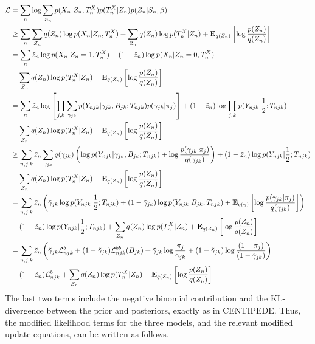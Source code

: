 \documentclass[reqno]{amsart}
\numberwithin{equation}{section}
\begin{document}
\begin{align}
    \likelihood
        &= \sum_{n} \log \sum_{Z_n} p(X_n|Z_n,T^X_n) p(T^X_n|Z_n) p(Z_n|S_n,\beta) \\
        &\geq \sum_n \sum_{Z_n} q(Z_n) \log p(X_n|Z_n,T^X_n) + \sum_{Z_n} q(Z_n) \log p(T^X_n | Z_n) + \expect{\log \frac{p(Z_n)}{q(Z_n)}}{q(Z_n)} \\
        &= \sum_n \zv_n \log p(X_n|Z_n=1,T^X_n) + (1-\zv_n) \log p(X_n|Z_n=0,T^X_n) \notag\\
        &+ \sum_{Z_n} q(Z_n) \log p(T^X_n | Z_n) + \expect{\log \frac{p(Z_n)}{q(Z_n)}}{q(Z_n)} \\
        &= \sum_n \zv_n \log \left[ \prod_{j,k} \sum_{\gamma_{jk}} p(Y_{njk} | \gamma_{jk}, B_{jk}; T_{njk}) p(\gamma_{jk} | \pi_j) \right]
        + (1-\zv_n) \log \prod_{j,k} p(Y_{njk} | \half; T_{njk}) \notag\\
        &+ \sum_{Z_n} q(Z_n) \log p(T^X_n | Z_n) + \expect{\log \frac{p(Z_n)}{q(Z_n)}}{q(Z_n)} \\
        &\geq \sum_{n,j,k} \zv_n \sum_{\gamma_{jk}} q(\gamma_{jk}) \left( \log p(Y_{njk} | \gamma_{jk}, B_{jk}; T_{njk}) 
        + \log \frac{p(\gamma_{jk} | \pi_j)}{q(\gamma_{jk})} \right) 
        + (1-\zv_n) \log p(Y_{njk} | \half; T_{njk}) \notag\\
        &+ \sum_{Z_n} q(Z_n) \log p(T^X_n | Z_n) + \expect{\log \frac{p(Z_n)}{q(Z_n)}}{q(Z_n)} \\
        &= \sum_{n,j,k} \zv_n \left( \gammav_{jk} \log p(Y_{njk} | \half; T_{njk}) + (1-\gammav_{jk}) \log p(Y_{njk} | B_{jk}; T_{njk})
        + \expect{\log \frac{p(\gamma_{jk} | \pi_j)}{q(\gamma_{jk})}}{q(\gamma)} \right) \notag\\
        &+ (1-\zv_n) \log p(Y_{njk} | \half; T_{njk}) 
        + \sum_{Z_n} q(Z_n) \log p(T^X_n | Z_n) + \expect{\log \frac{p(Z_n)}{q(Z_n)}}{q(Z_n)} \\
        &= \sum_{n,j,k} \zv_n \left( \gammav_{jk} \likelihood^b_{njk} + (1-\gammav_{jk}) \likelihood^{bb}_{njk}(B_{jk})
        + \gammav_{jk} \log \frac{\pi_j}{\gammav_{jk}} + (1-\gammav_{jk}) \log \frac{(1-\pi_j)}{(1-\gammav_{jk})} \right) \notag\\
        &+ (1-\zv_n) \likelihood^b_{njk} + \sum_{Z_n} q(Z_n) \log p(T^X_n | Z_n) + \expect{\log \frac{p(Z_n)}{q(Z_n)}}{q(Z_n)} \\
\end{align}
The last two terms include the negative binomial contribution and the KL-divergence between the prior and posteriors, exactly as in CENTIPEDE.
Thus, the modified likelihood terms for the three models, and the relevant modified update equations, can be written as follows.
\end{document}
